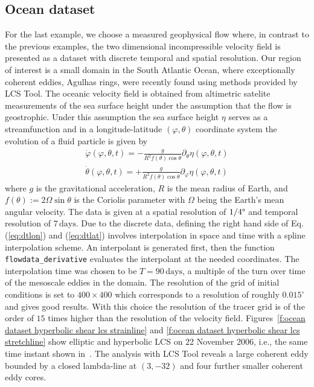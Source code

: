 \documentclass{article}
\begin{document}
\clearpage

\subsection{Ocean dataset}

For the last example, we choose a measured geophysical flow where, in contrast to the previous examples, the two dimensional incompressible velocity field is presented as a dataset with discrete temporal and spatial resolution. Our region of interest is a small domain in the South Atlantic Ocean, where exceptionally coherent eddies, Agulhas rings, were recently found using methods provided by LCS Tool\parencite{haller13:_coher_lagran}. The oceanic velocity field is obtained from altimetric satelite measurements of the sea surface height under the assumption that the flow is geostrophic. Under this assumption the sea surface height $\eta$ serves as a streamfunction and in a longitude-latitude $(\varphi,\theta)$ coordinate system the evolution of a fluid particle is given by
\begin{eqnarray}
\dot{\varphi}(\varphi,\theta,t) = -\frac{g}{R^2 f(\theta) \cos\theta}\partial_{\theta}\eta(\varphi,\theta,t)\label{eq:dtlon}\\
\dot{\theta}(\varphi,\theta,t) = +\frac{g}{R^2 f(\theta) \cos\theta}\partial_{\varphi}\eta(\varphi,\theta,t)
\label{eq:dtlat}
\end{eqnarray}
where $g$ is the gravitational acceleration, $R$ is the mean radius of Earth, and $f(\theta):=2\Omega\sin\theta$ is the Coriolis parameter with $\Omega$ being the Earth's mean angular velocity. The data is given at a spatial resolution of $1/4\degree$ and temporal resolution of $7\,\mathrm{days}$. Due to the discrete data, defining the right hand side of Eq.\,(\ref{eq:dtlon}) and (\ref{eq:dtlat}) involves interpolation in space and time with a spline interpolation scheme. An interpolant is generated first, then the function \lstinline!flowdata_derivative! evaluates the interpolant at the needed coordinates. The interpolation time was chosen to be $T=90\,\mathrm{days}$, a multiple of the turn over time of the mesoscale eddies in the domain. The resolution of the grid of initial conditions is set to $400\times400$ which corresponds to a resolution of roughly $0.015^\circ$ and gives good results. With this choice the resolution of the tracer grid is of the order of $15$ times higher than the resolution of the velocity field.
Figures~\ref{f:ocean dataset hyperbolic shear lcs strainline} and \ref{f:ocean dataset hyperbolic shear lcs stretchline} show elliptic and hyperbolic LCS on 22 November 2006, i.e., the same time instant shown in~\textcite{haller13:_coher_lagran,beron-vera13:_objec_agulh}. The analysis with LCS Tool reveals a large coherent eddy bounded by a closed lambda-line at $(3,-32)$ and four further smaller coherent eddy cores. 
\end{document}
